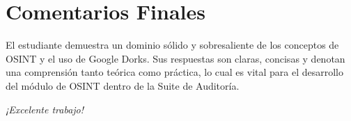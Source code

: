 \documentclass[12pt,a4paper]{article}
\begin{document}
\vspace{1cm}

\section*{Comentarios Finales}
\noindent El estudiante demuestra un dominio sólido y sobresaliente de los conceptos de OSINT y el uso de Google Dorks. Sus respuestas son claras, concisas y denotan una comprensión tanto teórica como práctica, lo cual es vital para el desarrollo del módulo de OSINT dentro de la Suite de Auditoría.

\vspace{0.5cm}
\begin{center}
    \textit{¡Excelente trabajo!}
\end{center}
\end{document}
